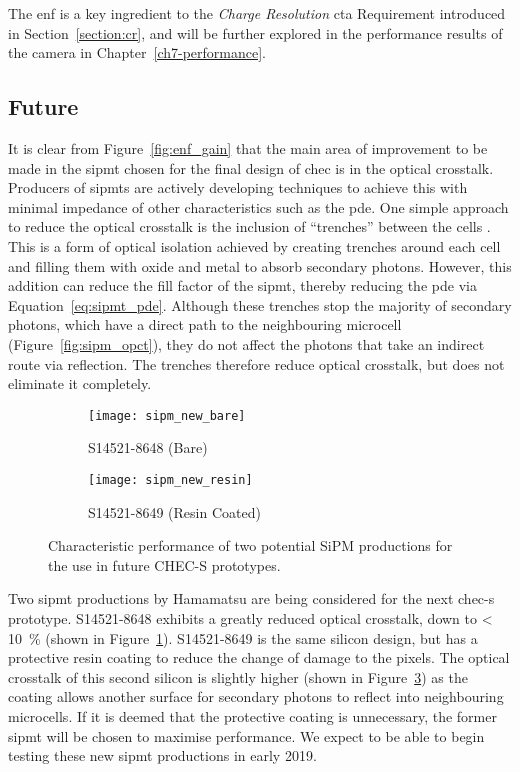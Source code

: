The \gls{enf} is a key ingredient to the \textit{Charge Resolution} \gls{cta} Requirement introduced in Section~\ref{section:cr}, and will be further explored in the performance results of the camera in Chapter~\ref{ch7-performance}.

\subsection{Future} \label{section:sipmt_future}

It is clear from Figure~\ref{fig:enf_gain} that the main area of improvement to be made in the \gls{sipmt} chosen for the final design of \gls{chec} is in the optical crosstalk. Producers of \glspl{sipmt} are actively developing techniques to achieve this with minimal impedance of other characteristics such as the \gls{pde}. One simple approach to reduce the optical crosstalk is the inclusion of ``trenches'' between the cells \cite{Kindt1998,Pagano2011}. This is a form of optical isolation achieved by creating trenches around each cell and filling them with oxide and metal to absorb secondary photons. However, this addition can reduce the fill factor of the \gls{sipmt}, thereby reducing the \gls{pde} via Equation~\ref{eq:sipmt_pde}. Although these trenches stop the majority of secondary photons, which have a direct path to the neighbouring microcell (Figure~\ref{fig:sipm_opct}), they do not affect the photons that take an indirect route via reflection. The trenches therefore reduce optical crosstalk, but does not eliminate it completely.

\begin{figure}
  \begin{subfigure}[b]{0.49\textwidth}
    \texttt{[image: sipm\_new\_bare]}
    \caption{S14521-8648 (Bare) \cite{Hamamatsu2018a}}
    \label{fig:sipm_new_bare}
  \end{subfigure}
  \hfill
  \begin{subfigure}[b]{0.49\textwidth}
    \texttt{[image: sipm\_new\_resin]}
    \caption{S14521-8649 (Resin Coated) \cite{Hamamatsu2018b}}
    \label{fig:sipm_new_resin}
  \end{subfigure}
  \caption[Characteristic performance of future CHEC-S SiPMs.]{Characteristic performance of two potential SiPM productions for the use in future CHEC-S prototypes.}
\end{figure}

Two \gls{sipmt} productions by Hamamatsu are being considered for the next \gls{chec-s} prototype. S14521-8648 exhibits a greatly reduced optical crosstalk, down to \SI{< 10}{\percent} (shown in Figure~\ref{fig:sipm_new_bare}). S14521-8649 is the same silicon design, but has a protective resin coating to reduce the change of damage to the pixels. The optical crosstalk of this second silicon is slightly higher (shown in Figure~\ref{fig:sipm_new_resin}) as the coating allows another surface for secondary photons to reflect into neighbouring microcells. If it is deemed that the protective coating is unnecessary, the former \gls{sipmt} will be chosen to maximise performance. We expect to be able to begin testing these new \gls{sipmt} productions in early 2019.

